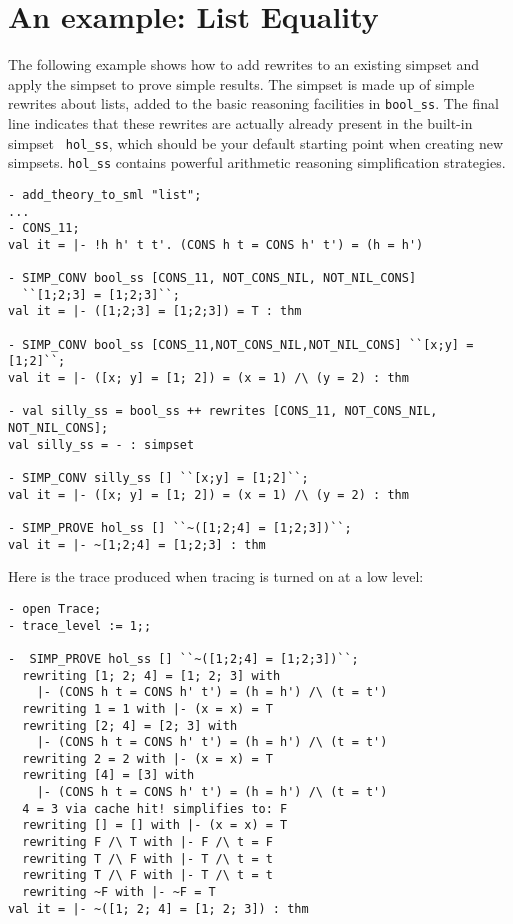 \section{An example: List Equality}

The following example shows how to add rewrites to an existing simpset
and apply the simpset to prove simple results.  The simpset is made up
of simple rewrites about lists, added to the basic reasoning
facilities in {\tt bool\_ss}.  The final line indicates that these
rewrites are actually already present in the built-in simpset {\tt
hol\_ss}, which should be your default starting point when creating
new simpsets.  {\tt hol\_ss} contains powerful arithmetic reasoning
simplification strategies.
\begin{boxed} \begin{verbatim}
- add_theory_to_sml "list";
...
- CONS_11;
val it = |- !h h' t t'. (CONS h t = CONS h' t') = (h = h')

- SIMP_CONV bool_ss [CONS_11, NOT_CONS_NIL, NOT_NIL_CONS]
  ``[1;2;3] = [1;2;3]``;
val it = |- ([1;2;3] = [1;2;3]) = T : thm

- SIMP_CONV bool_ss [CONS_11,NOT_CONS_NIL,NOT_NIL_CONS] ``[x;y] = [1;2]``;
val it = |- ([x; y] = [1; 2]) = (x = 1) /\ (y = 2) : thm

- val silly_ss = bool_ss ++ rewrites [CONS_11, NOT_CONS_NIL, NOT_NIL_CONS];
val silly_ss = - : simpset

- SIMP_CONV silly_ss [] ``[x;y] = [1;2]``;
val it = |- ([x; y] = [1; 2]) = (x = 1) /\ (y = 2) : thm

- SIMP_PROVE hol_ss [] ``~([1;2;4] = [1;2;3])``;
val it = |- ~[1;2;4] = [1;2;3] : thm

\end{verbatim} \end{boxed}
Here is the trace produced when tracing is turned on at a low level:
\begin{boxed} \begin{verbatim}
- open Trace;
- trace_level := 1;;

-  SIMP_PROVE hol_ss [] ``~([1;2;4] = [1;2;3])``;
  rewriting [1; 2; 4] = [1; 2; 3] with
    |- (CONS h t = CONS h' t') = (h = h') /\ (t = t')
  rewriting 1 = 1 with |- (x = x) = T
  rewriting [2; 4] = [2; 3] with
    |- (CONS h t = CONS h' t') = (h = h') /\ (t = t')
  rewriting 2 = 2 with |- (x = x) = T
  rewriting [4] = [3] with
    |- (CONS h t = CONS h' t') = (h = h') /\ (t = t')
  4 = 3 via cache hit! simplifies to: F
  rewriting [] = [] with |- (x = x) = T
  rewriting F /\ T with |- F /\ t = F
  rewriting T /\ F with |- T /\ t = t
  rewriting T /\ F with |- T /\ t = t
  rewriting ~F with |- ~F = T
val it = |- ~([1; 2; 4] = [1; 2; 3]) : thm
\end{verbatim} \end{boxed}


